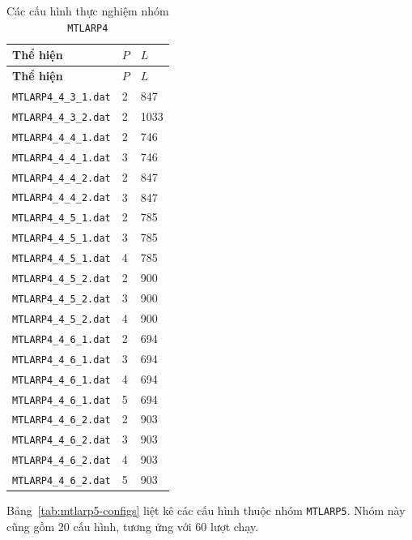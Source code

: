 \begin{longtable}{p{5.4cm}C{1.2cm}C{1.8cm}}
\caption{Các cấu hình thực nghiệm nhóm \texttt{MTLARP4}}
\label{tab:mtlarp4-configs}\\
\toprule
\textbf{Thể hiện} & \textbf{\(P\)} & \textbf{\(L\)} \\
\midrule
\endfirsthead
\toprule
\textbf{Thể hiện} & \textbf{\(P\)} & \textbf{\(L\)} \\
\midrule
\endhead
\bottomrule
\endfoot
\texttt{MTLARP4\_4\_3\_1.dat} & 2 & 847 \\
\texttt{MTLARP4\_4\_3\_2.dat} & 2 & 1033 \\
\texttt{MTLARP4\_4\_4\_1.dat} & 2 & 746 \\
\texttt{MTLARP4\_4\_4\_1.dat} & 3 & 746 \\
\texttt{MTLARP4\_4\_4\_2.dat} & 2 & 847 \\
\texttt{MTLARP4\_4\_4\_2.dat} & 3 & 847 \\
\texttt{MTLARP4\_4\_5\_1.dat} & 2 & 785 \\
\texttt{MTLARP4\_4\_5\_1.dat} & 3 & 785 \\
\texttt{MTLARP4\_4\_5\_1.dat} & 4 & 785 \\
\texttt{MTLARP4\_4\_5\_2.dat} & 2 & 900 \\
\texttt{MTLARP4\_4\_5\_2.dat} & 3 & 900 \\
\texttt{MTLARP4\_4\_5\_2.dat} & 4 & 900 \\
\texttt{MTLARP4\_4\_6\_1.dat} & 2 & 694 \\
\texttt{MTLARP4\_4\_6\_1.dat} & 3 & 694 \\
\texttt{MTLARP4\_4\_6\_1.dat} & 4 & 694 \\
\texttt{MTLARP4\_4\_6\_1.dat} & 5 & 694 \\
\texttt{MTLARP4\_4\_6\_2.dat} & 2 & 903 \\
\texttt{MTLARP4\_4\_6\_2.dat} & 3 & 903 \\
\texttt{MTLARP4\_4\_6\_2.dat} & 4 & 903 \\
\texttt{MTLARP4\_4\_6\_2.dat} & 5 & 903 \\
\end{longtable}

Bảng~\ref{tab:mtlarp5-configs} liệt kê các cấu hình thuộc nhóm \texttt{MTLARP5}. Nhóm này cũng gồm 20 cấu hình, tương ứng với 60 lượt chạy.

